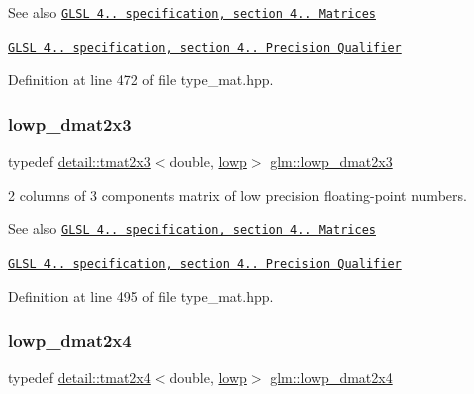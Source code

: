 \begin{DoxySeeAlso}{See also}
\href{http://www.opengl.org/registry/doc/GLSLangSpec.4.20.8.pdf}{\tt G\+L\+SL 4.. specification, section 4.. Matrices} 

\href{http://www.opengl.org/registry/doc/GLSLangSpec.4.20.8.pdf}{\tt G\+L\+SL 4.. specification, section 4.. Precision Qualifier} 
\end{DoxySeeAlso}


Definition at line 472 of file type\+\_\+mat.\+hpp.

\mbox{\label{group__core__precision_ga2c7432984a35cf72050870a54485ef35}} 
\subsubsection{\texorpdfstring{lowp\+\_\+dmat2x3}{lowp\_dmat2x3}}
{\footnotesize\ttfamily typedef \hyperlink{structglm_1_1detail_1_1tmat2x3}{detail\+::tmat2x3}$<$double, \hyperlink{namespaceglm_a0f04f086094c747d227af4425893f545ae161af3fc695e696ce3bf69f7332bc2d}{lowp}$>$ \hyperlink{group__core__precision_ga2c7432984a35cf72050870a54485ef35}{glm\+::lowp\+\_\+dmat2x3}}

2 columns of 3 components matrix of low precision floating-\/point numbers.

\begin{DoxySeeAlso}{See also}
\href{http://www.opengl.org/registry/doc/GLSLangSpec.4.20.8.pdf}{\tt G\+L\+SL 4.. specification, section 4.. Matrices} 

\href{http://www.opengl.org/registry/doc/GLSLangSpec.4.20.8.pdf}{\tt G\+L\+SL 4.. specification, section 4.. Precision Qualifier} 
\end{DoxySeeAlso}


Definition at line 495 of file type\+\_\+mat.\+hpp.

\mbox{\label{group__core__precision_gac2285cef559b0dc35cb9a7f22e6a2dd8}} 
\subsubsection{\texorpdfstring{lowp\+\_\+dmat2x4}{lowp\_dmat2x4}}
{\footnotesize\ttfamily typedef \hyperlink{structglm_1_1detail_1_1tmat2x4}{detail\+::tmat2x4}$<$double, \hyperlink{namespaceglm_a0f04f086094c747d227af4425893f545ae161af3fc695e696ce3bf69f7332bc2d}{lowp}$>$ \hyperlink{group__core__precision_gac2285cef559b0dc35cb9a7f22e6a2dd8}{glm\+::lowp\+\_\+dmat2x4}}

